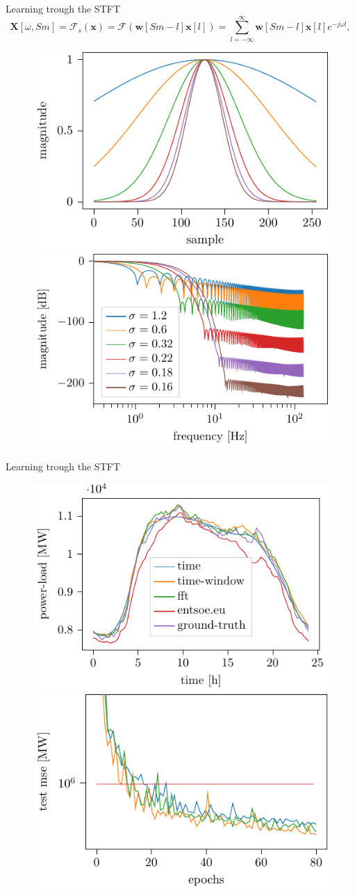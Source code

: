 \documentclass[xcolor=dvipsnames]{beamer}
\begin{document}
\begin{frame}{Learning trough the STFT}
\begin{equation}
    \mathbf{X} [\omega, Sm] 
    = \mathcal{F}_s\left(\mathbf{x}\right) = \mathcal{F}\left(\mathbf{w}[Sm - l]\mathbf{x}[l]\right) = \sum_{l = -\infty}^{\infty} \mathbf{w}[Sm - l]\mathbf{x}[l]e^{-j\omega l},
    \label{eq:STFT}
\end{equation}
\begin{figure}
    \centering
    \includegraphics[width=0.49\linewidth]{./img/gaussian_window_sigma_plot.pdf}
    \includegraphics[width=0.49\linewidth]{./img/gaussian_window_sigma_freq_plot.pdf}
\end{figure}
\end{frame}

\begin{frame}{Learning trough the STFT \cite{wolter2018Fourier}}
\begin{figure}
    \centering
    \includegraphics[width=0.49\linewidth]{./img/day_ahead_plot.pdf}
    \includegraphics[width=0.49\linewidth]{./img/power_pred_15min_1d_test.pdf}
\end{figure}
\end{frame}
\end{document}

